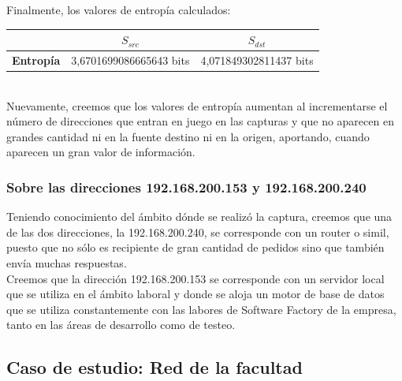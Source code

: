 \indent Finalmente, los valores de entropía calculados:\\

\begin{centering}
	\begin{tabular}{ | c | c | c |} \hline
	   & \textbf{$S_{src}$} & \textbf{$S_{dst}$} \\ \hline
	  	\textbf{Entropía} & 3,6701699086665643 bits & 4,071849302811437 bits \\ \hline
	\end{tabular}
\end{centering}\\

\indent Nuevamente, creemos que los valores de entropía aumentan al incrementarse el número de direcciones que entran en juego en las capturas y que no aparecen en grandes cantidad ni en la fuente destino ni en la origen, aportando, cuando aparecen un gran valor de información.\\


\subsubsection{Sobre las direcciones 192.168.200.153 y 192.168.200.240}

\indent Teniendo conocimiento del ámbito dónde se realizó la captura, creemos que una de las dos direcciones, la 192.168.200.240, se corresponde con un router o simil, puesto que no sólo es recipiente de gran cantidad de pedidos sino que también envía muchas respuestas.\\
\indent Creemos que la dirección 192.168.200.153 se corresponde con un servidor local que se utiliza en el ámbito laboral y donde se aloja un motor de base de datos que se utiliza constantemente con las labores de Software Factory de la empresa, tanto en las áreas de desarrollo como de testeo.\\

\subsection{Caso de estudio: Red de la facultad}

